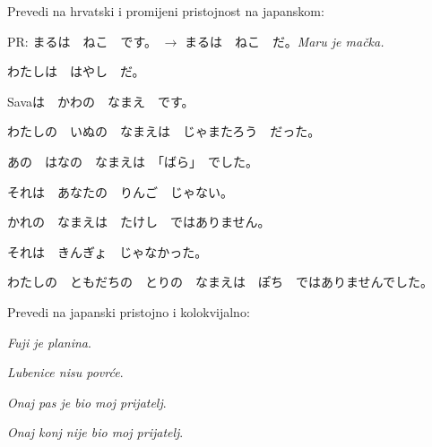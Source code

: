 
\author{Katja Kržišnik}

	
	\begin{mondai}{\ten Prevedi na hrvatski i promijeni pristojnost na japanskom:}
		\item PR: まるは　ねこ　です。 $\rightarrow$ まるは　ねこ　だ。\hspace{20pt}\textit{Maru je mačka.}
		\item わたしは　はやし　だ。
		\item Savaは　かわの　なまえ　です。
		\item わたしの　いぬの　なまえは　じゃまたろう　だった。
		\item あの　はなの　なまえは　「ばら」　でした。
		\item それは　あなたの　りんご　じゃない。
		\item かれの　なまえは　たけし　ではありません。
		\item それは　きんぎょ　じゃなかった。
		\item わたしの　ともだちの　とりの　なまえは　ぽち　ではありませんでした。
	\end{mondai}
	
	\begin{mondai}{\ten Prevedi na japanski pristojno i kolokvijalno:}
		\item \textit{Fuji je planina}.
		\item \textit{Lubenice nisu povrće}.
		\item \textit{Onaj pas je bio moj prijatelj}.
		\item \textit{Onaj konj nije bio moj prijatelj}. 
	\end{mondai}
